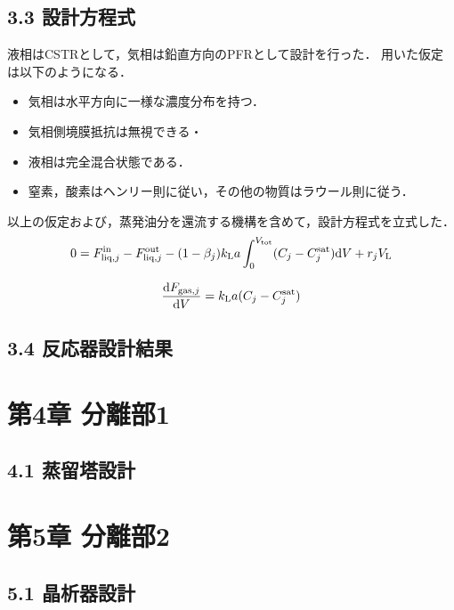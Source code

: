 \documentclass[platex, a4j]{jsarticle}
\begin{document}
\section*{3.3 設計方程式}
液相はCSTRとして，気相は鉛直方向のPFRとして設計を行った．
用いた仮定は以下のようになる．
\begin{itemize}
    \item 気相は水平方向に一様な濃度分布を持つ．\\
    \item 気相側境膜抵抗は無視できる・\\
    \item 液相は完全混合状態である．\\
    \item 窒素，酸素はヘンリー則に従い，その他の物質はラウール則に従う．
\end{itemize}
以上の仮定および，蒸発油分を還流する機構を含めて，設計方程式を立式した．\\
\begin{equation}\nonumber
    0=F^{{\rm in}}_{{\rm liq},j}-F^{{\rm out}}_{{\rm liq},j} -(1-\beta_j) k_{{\rm L}}a
    \int^{V_{{\rm tot}}}_0(C_j - C^{{\rm sat}}_j){\rm d}V + r_j V_{{\rm L}}
\end{equation}

\begin{equation}\nonumber
    \frac{{\rm d}F_{{\rm gas},j}}{{\rm d}V} = k_{{\rm L}}a(C_j - C^{{\rm sat}}_j)
\end{equation}

\section*{3.4 反応器設計結果}


\chapter*{第4章 分離部1}
\section*{4.1 蒸留塔設計}


\chapter*{第5章 分離部2}

\section*{5.1 晶析器設計}
\end{document}
